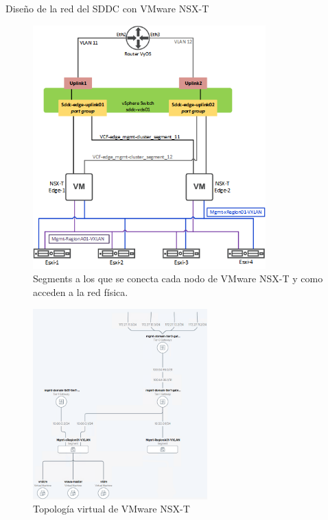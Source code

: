 \begin{subsubsection}{Diseño de la red del SDDC con VMware NSX-T}
\begin{figure}[h]
        \includegraphics[width=0.8\textwidth]{imaxes/pruebaconcepto/estructura_NSX_T.png}
        \caption{Segments a los que se conecta cada nodo de VMware NSX-T y como acceden a la red física.}
        \label{fig:estructura-NSXT}
      \end{figure}
      \FloatBarrier

    \begin{figure}[h]
        \centering
        \includegraphics[width=0.6\textwidth]{imaxes/pruebaconcepto/topologiaTwoTierRouting-Final.png}
        \caption{Topología virtual de VMware NSX-T}
        \label{fig:two-tier-topology} 
    \end{figure}
    \FloatBarrier


\end{subsubsection}
